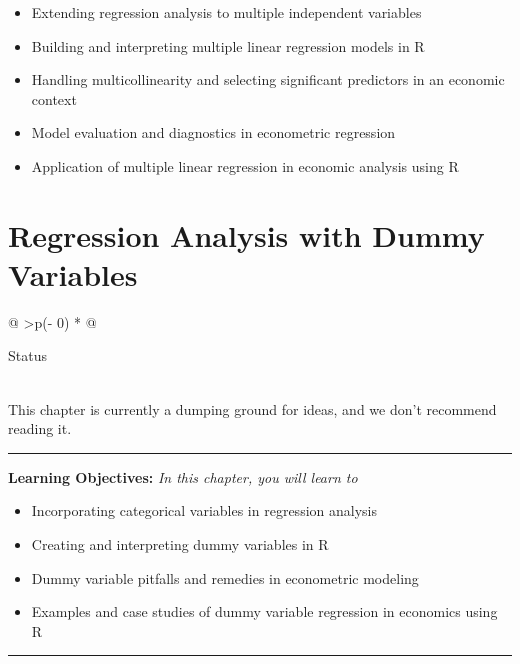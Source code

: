 \documentclass[
  letterpaper,
  twoside,
  openright,
  headsepline,
  footsepline,
  listof = totocnumbered,
  chapterprefix = true,
  titlepage = false]{scrbook}
\providecommand{\abstractname}{Learning Objectives} %
\newenvironment{objectives}[1]{%
	\hrule
	\vspace{5pt}
	\small\textbf{\abstractname: } 
	\newline
	\vspace{0.1cm}
	\small\emph{#1} %
	\itshape %
}{%
	\vspace{5pt}
	\hrule
	\vspace{0.6cm}
}
\begin{document}
\begin{itemize}
\item
  Extending regression analysis to multiple independent variables
\item
  Building and interpreting multiple linear regression models in R
\item
  Handling multicollinearity and selecting significant predictors in an
  economic context
\item
  Model evaluation and diagnostics in econometric regression
\item
  Application of multiple linear regression in economic analysis using R
\end{itemize}


\hypertarget{regression-analysis-with-dummy-variables}{%
\chapter{Regression Analysis with Dummy
Variables}\label{regression-analysis-with-dummy-variables}}

\begin{longtable}[]{@{}
  >{\centering\arraybackslash}p{(\columnwidth - 0\tabcolsep) * }@{}}
\toprule\noalign{}
\begin{minipage}[b]{\linewidth}\centering
Status
\end{minipage} \\
\midrule\noalign{}
\endhead
\bottomrule\noalign{}
\endlastfoot
This chapter is currently a dumping ground for ideas, and we don't
recommend reading it. \\
\end{longtable}

\begin{objectives}{In this chapter, you will learn to}
\begin{itemize}

\item{Incorporating categorical variables in regression analysis}

\item{Creating and interpreting dummy variables in R}

\item{Dummy variable pitfalls and remedies in econometric modeling}

\item{Examples and case studies of dummy variable regression in economics using R}

\end{itemize}

\end{objectives}
\end{document}
